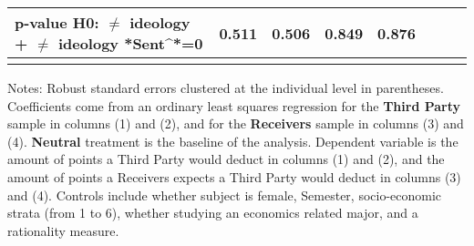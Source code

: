 \begin{table}[H]
{\begin{threeparttable}
\begin{tabular}{lccccccc}
p-value H0: $\neq$ ideology + $\neq$ ideology *Sent^{*}=0&       0.511         &       0.506         &       0.849         &       0.876         \\
\bottomrule[0.5pt]                                                                               \label{tab:table2}                                                                       \end{tabular}                                                                                                    \vspace{-13pt}                                                                                           \begin{tablenotes}[flushleft]{\setlength{\itemindent}{-3pt}}          \small                                                                                                               \item Notes: Robust standard errors clustered at the individual level in parentheses. Coefficients come from an ordinary least squares regression for the \textbf{Third Party} sample in columns (1) and (2), and for the \textbf{Receivers} sample in columns (3) and (4). \textbf{Neutral} treatment is the baseline of the analysis. Dependent variable is the amount of points a Third Party would deduct in columns (1) and (2), and the amount of points a Receivers expects a Third Party would deduct in columns (3) and (4). Controls include whether subject is female, Semester, socio-economic strata (from 1 to 6), whether studying an economics related major, and a rationality measure.          \end{tablenotes}                                                                                         \end{threeparttable}                                                                             }                                                                                                                        \end{table}
